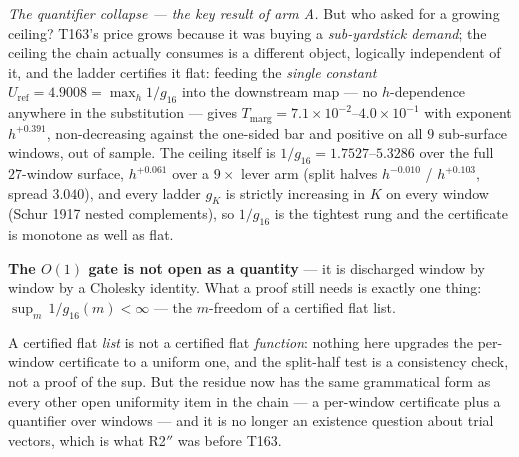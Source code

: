 \documentclass[11pt,a4paper]{article}
\begin{document}
\emph{The quantifier collapse --- the key result of arm A.} But who asked for
a growing ceiling? T163's price grows because it was buying a
\emph{sub-yardstick demand}; the ceiling the chain actually consumes is a
different object, logically independent of it, and the ladder certifies it
flat: feeding the \emph{single constant}
$U_{\mathrm{ref}}=4.9008=\max_h1/g_{16}$ into the downstream map --- no
$h$-dependence anywhere in the substitution --- gives
$T_{\mathrm{marg}}=7.1\times10^{-2}$--$4.0\times10^{-1}$ with exponent
$h^{+0.391}$, non-decreasing against the one-sided bar and positive on all $9$
sub-surface windows, out of sample. The ceiling itself is
$1/g_{16}=1.7527$--$5.3286$ over the full $27$-window surface, $h^{+0.061}$
over a $9\times$ lever arm (split halves $h^{-0.010}$ / $h^{+0.103}$, spread
$3.040$), and every ladder $g_K$ is strictly increasing in $K$ on every window
(Schur 1917 nested complements), so $1/g_{16}$ is the tightest rung and the
certificate is monotone as well as flat.

\begin{keyeq}
\textbf{The $O(1)$ gate is not open as a quantity} --- it is discharged window
by window by a Cholesky identity. What a proof still needs is exactly one
thing: $\displaystyle\sup_m\,1/g_{16}(m)<\infty$ --- the $m$-freedom of a
certified flat list.
\end{keyeq}

\noindent A certified flat \emph{list} is not a certified flat
\emph{function}: nothing here upgrades the per-window certificate to a uniform
one, and the split-half test is a consistency check, not a proof of the sup.
But the residue now has the same grammatical form as every other open
uniformity item in the chain --- a per-window certificate plus a quantifier
over windows --- and it is no longer an existence question about trial
vectors, which is what R2$''$ was before T163.
\end{document}
